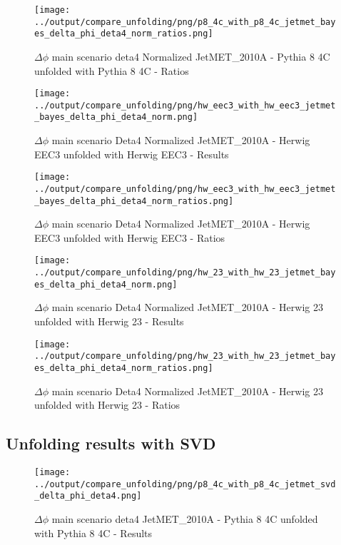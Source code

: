 \documentclass[11pt]{book}
\begin{document}
\begin{figure}[ht]
\centering
\texttt{[image: ../output/compare\_unfolding/png/p8\_4c\_with\_p8\_4c\_jetmet\_bayes\_delta\_phi\_deta4\_norm\_ratios.png]}
\caption{$\Delta\phi$ main scenario deta4 Normalized JetMET\_2010A - Pythia 8 4C unfolded with Pythia 8 4C - Ratios}
\label{p8_p8_jetmet_bayes_delta_phi_deta4_norm_b}
\end{figure}

\begin{figure}[ht]
\centering
\texttt{[image: ../output/compare\_unfolding/png/hw\_eec3\_with\_hw\_eec3\_jetmet\_bayes\_delta\_phi\_deta4\_norm.png]}
\caption{$\Delta\phi$ main scenario Deta4 Normalized JetMET\_2010A - Herwig EEC3 unfolded with Herwig EEC3 - Results}
\label{hw_eec3_hw_eec3_jetmet_bayes_delta_phi_deta4_norm_a}
\end{figure}

\begin{figure}[ht]
\centering
\texttt{[image: ../output/compare\_unfolding/png/hw\_eec3\_with\_hw\_eec3\_jetmet\_bayes\_delta\_phi\_deta4\_norm\_ratios.png]}
\caption{$\Delta\phi$ main scenario Deta4 Normalized JetMET\_2010A - Herwig EEC3 unfolded with Herwig EEC3 - Ratios}
\label{hw_eec3_hw_eec3_jetmet_bayes_delta_phi_deta4_norm_b}
\end{figure}

\begin{figure}[ht]
\centering
\texttt{[image: ../output/compare\_unfolding/png/hw\_23\_with\_hw\_23\_jetmet\_bayes\_delta\_phi\_deta4\_norm.png]}
\caption{$\Delta\phi$ main scenario Deta4 Normalized JetMET\_2010A - Herwig 23 unfolded with Herwig 23 - Results}
\label{hw_23_hw_23_jetmet_bayes_delta_phi_deta4_norm_a}
\end{figure}

\begin{figure}[ht]
\centering
\texttt{[image: ../output/compare\_unfolding/png/hw\_23\_with\_hw\_23\_jetmet\_bayes\_delta\_phi\_deta4\_norm\_ratios.png]}
\caption{$\Delta\phi$ main scenario Deta4 Normalized JetMET\_2010A - Herwig 23 unfolded with Herwig 23 - Ratios}
\label{hw_23_hw_23_jetmet_bayes_delta_phi_deta4_norm_b}
\end{figure}


\clearpage
\subsection{Unfolding results with SVD}

\begin{figure}[ht]
\centering
\texttt{[image: ../output/compare\_unfolding/png/p8\_4c\_with\_p8\_4c\_jetmet\_svd\_delta\_phi\_deta4.png]}
\caption{$\Delta\phi$ main scenario deta4 JetMET\_2010A - Pythia 8 4C unfolded with Pythia 8 4C - Results}
\label{p8_p8_jetmet_svd_delta_phi_deta4_a}
\end{figure}
\end{document}
